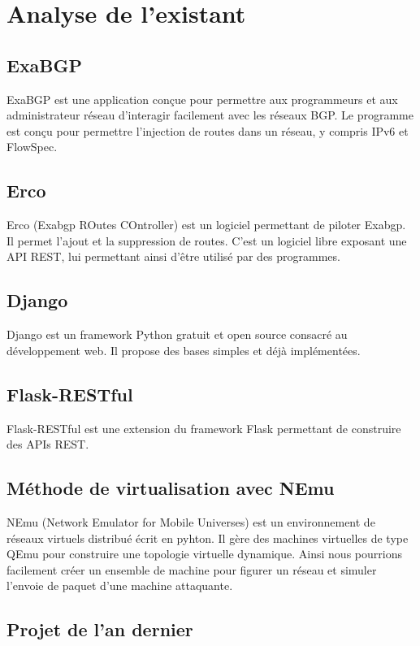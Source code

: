 \chapter{Analyse de l'existant}

\section{ExaBGP}
ExaBGP est une application conçue pour permettre aux programmeurs et aux administrateur réseau d’interagir facilement avec les réseaux BGP. Le programme est conçu pour permettre l’injection de routes dans un réseau, y compris IPv6 et FlowSpec.
\cite{Man10}

\section{Erco}
Erco (Exabgp ROutes COntroller) est un logiciel permettant de piloter Exabgp. Il permet l'ajout et la suppression de routes. C'est un logiciel libre exposant une API REST, lui permettant ainsi d'être utilisé par des programmes.

\section{Django}
Django est un framework Python gratuit et open source consacré au développement web. Il propose des bases simples et déjà implémentées.

\section{Flask-RESTful}
Flask-RESTful est une extension du framework Flask permettant de construire des APIs REST.


\section{Méthode de virtualisation avec NEmu}
NEmu (Network Emulator for Mobile Universes) est un environnement de réseaux virtuels distribué écrit en pyhton. Il gère des machines virtuelles de type QEmu pour construire une topologie virtuelle dynamique.
Ainsi nous pourrions facilement créer un ensemble de machine pour figurer un réseau et simuler l'envoie de paquet d'une machine attaquante.

\section{Projet de l'an dernier}

